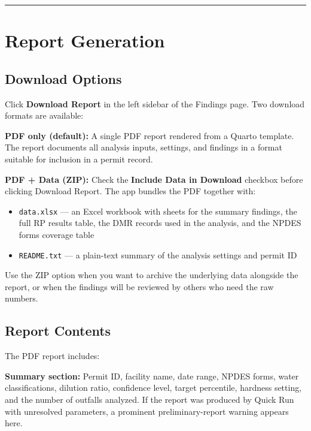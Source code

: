 \documentclass[
  11pt,
  letterpaper,
  DIV=11,
  numbers=noendperiod]{scrartcl}
\providecommand{\tightlist}{%
  \setlength{\itemsep}{0pt}\setlength{\parskip}{0pt}}
\begin{document}
\begin{center}\rule{0.5\linewidth}{0.5pt}\end{center}

\section{Report Generation}\label{sec-report}

\subsection{Download Options}\label{sec-download-options}

Click \textbf{Download Report} in the left sidebar of the Findings page.
Two download formats are available:

\textbf{PDF only (default):} A single PDF report rendered from a Quarto
template. The report documents all analysis inputs, settings, and
findings in a format suitable for inclusion in a permit record.

\textbf{PDF + Data (ZIP):} Check the \textbf{Include Data in Download}
checkbox before clicking Download Report. The app bundles the PDF
together with:

\begin{itemize}
\tightlist
\item
  \texttt{data.xlsx} --- an Excel workbook with sheets for the summary
  findings, the full RP results table, the DMR records used in the
  analysis, and the NPDES forms coverage table
\item
  \texttt{README.txt} --- a plain-text summary of the analysis settings
  and permit ID
\end{itemize}

Use the ZIP option when you want to archive the underlying data
alongside the report, or when the findings will be reviewed by others
who need the raw numbers.

\subsection{Report Contents}\label{sec-report-contents}

The PDF report includes:

\textbf{Summary section:} Permit ID, facility name, date range, NPDES
forms, water classifications, dilution ratio, confidence level, target
percentile, hardness setting, and the number of outfalls analyzed. If
the report was produced by Quick Run with unresolved parameters, a
prominent preliminary-report warning appears here.
\end{document}

